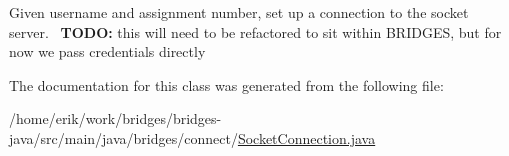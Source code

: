 Given username and assignment number, set up a connection to the socket server.~\newline
 {\bfseries T\+O\+DO\+:} this will need to be refactored to sit within B\+R\+I\+D\+G\+ES, but for now we pass credentials directly 

The documentation for this class was generated from the following file\+:\begin{DoxyCompactItemize}
\item 
/home/erik/work/bridges/bridges-\/java/src/main/java/bridges/connect/\hyperlink{_socket_connection_8java}{Socket\+Connection.\+java}\end{DoxyCompactItemize}
